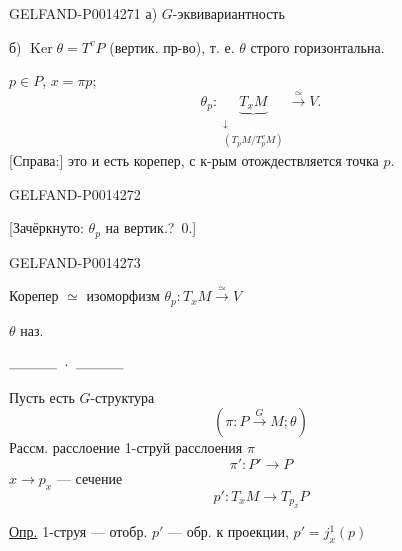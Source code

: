 \begin{GelfandAdjacentEvidence}{GELFAND-P001427}{1}
а) \(G\)-эквивариантность

б) \(\operatorname{Ker}\theta=T^vP\) (вертик. пр-во), т. е.
\(\theta\) строго горизонтальна.


\(p\in P\), \(x=\pi p\);
\[
\theta_p\colon
\underset{\substack{\downarrow\\ (T_pM/T_p^vM)}}{\underbrace{T_xM}}
\overset{\simeq}{\longrightarrow}V.
\]
[Справа:] это и есть корепер, с к-рым отождествляется точка \(p\).
\end{GelfandAdjacentEvidence}
\begin{GelfandAdjacentEvidence}{GELFAND-P001427}{2}


[Зачёркнуто: \(\theta_p\) на вертик.? \(\,0\).]
\end{GelfandAdjacentEvidence}
\begin{GelfandAdjacentEvidence}{GELFAND-P001427}{3}


Корепер \(\simeq\) изоморфизм
\(\theta_p\colon T_xM\overset{\simeq}{\longrightarrow}V\)

\(\theta\) наз. 

\begin{center}
\(\rule{1.2cm}{.3pt}\ \cdot\ \rule{1.2cm}{.3pt}\)
\end{center}

Пусть есть \(G\)-структура
\[
(\pi\colon P\overset{G}{\longrightarrow}M;\theta)
\]
Рассм. расслоение 1-струй расслоения \(\pi\)
\[
\pi'\colon P'\to P
\]
\(x\to p_x\) — сечение
\[
p'\colon T_xM\to T_{p_x}P
\]

\uline{Опр.} 1-струя — отобр. \(p'\) — обр. к проекции, \(p'=j_x^1(p)\)

\end{GelfandAdjacentEvidence}

